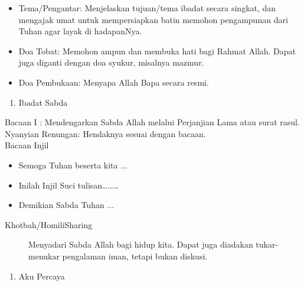 \documentclass{article}
\begin{document}
\begin{itemize}
\item \begin{description}
\item[Tema/Pengantar: Menjelaskan tujuan/tema ibadat secara singkat, dan
mengajak umat untuk mempersiapkan batin memohon pengampunan dari Tuhan
agar layak di hadapanNya.]
\end{description}
\item Doa Tobat: Memohon ampun dan membuka hati bagi Rahmat Allah. Dapat
juga diganti dengan doa syukur, misalnya mazmur.
\item Doa Pembukaan: Menyapa Allah Bapa secara resmi.
\end{itemize}
\begin{enumerate}
\item \begin{description}
\item[Ibadat Sabda]
\end{description}
\end{enumerate}
\begin{description}
\item[Bacaan I : Mendengarkan Sabda Allah melalui Perjanjian Lama atau
surat rasul.]

\item[Nyanyian Renungan: Hendaknya sesuai dengan bacaan.]

\item[Bacaan Injil]

\end{description}
\begin{itemize}
\item Semoga Tuhan beserta kita ...
\item Inilah Injil Suci tulisan{\dots}{\dots}{\dots}
\item Demikian Sabda Tuhan ...
\end{itemize}
\begin{description}
\item[Khotbah/HomiliSharing]

Menyadari Sabda Allah bagi hidup kita. Dapat juga diadakan tukar-menukar
pengalaman iman, tetapi bukan diskusi.

\end{description}
\begin{enumerate}
\item \begin{description}
\item[Aku Percaya]
\end{description}
\end{enumerate}
\end{document}
